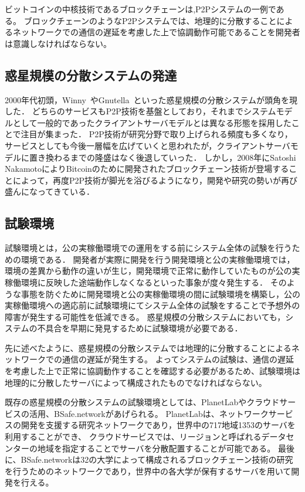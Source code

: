 ビットコインの中核技術であるブロックチェーンは,P2Pシステムの一例である。
ブロックチェーンのようなP2Pシステムでは、地理的に分散することによるネットワークでの通信の遅延を考慮した上で協調動作可能であることを開発者は意識しなければならない。

\subsection{惑星規模の分散システムの発達}

2000年代初頭，Winny~\cite{Winny}やGnutella~\cite{Gnutella}といった惑星規模の分散システムが頭角を現した．
どちらのサービスもP2P技術を基盤としており，それまでシステムモデルとして一般的であったクライアントサーバモデルとは異なる形態を採用したことで注目が集まった．
P2P技術が研究分野で取り上げられる頻度も多くなり，サービスとしても今後一層幅を広げていくと思われたが，クライアントサーバモデルに置き換わるまでの隆盛はなく後退していった．
しかし，2008年にSatoshi NakamotoによりBitcoinのために開発されたブロックチェーン技術が登場することによって，再度P2P技術が脚光を浴びるようになり，開発や研究の勢いが再び盛んになってきている．

\subsection{試験環境}

試験環境とは，公の実稼働環境での運用をする前にシステム全体の試験を行うための環境である．
開発者が実際に開発を行う開発環境と公の実稼働環境では，環境の差異から動作の違いが生じ，開発環境で正常に動作していたものが公の実稼働環境に反映した途端動作しなくなるといった事象が度々発生する．
そのような事態を防ぐために開発環境と公の実稼働環境の間に試験環境を構築し，公の実稼働環境への適応前に試験環境にてシステム全体の試験をすることで予想外の障害が発生する可能性を低減できる。
惑星規模の分散システムにおいても，システムの不具合を早期に発見するために試験環境が必要である．

先に述べたように、惑星規模の分散システムでは地理的に分散することによるネットワークでの通信の遅延が発生する。
よってシステムの試験は、通信の遅延を考慮した上で正常に協調動作することを確認する必要があるため、試験環境は地理的に分散したサーバによって構成されたものでなければならない。

既存の惑星規模の分散システムの試験環境としては、PlanetLabやクラウドサービスの活用、BSafe.networkがあげられる。
PlanetLabは、ネットワークサービスの開発を支援する研究ネットワークであり，世界中の717地域1353のサーバを利用することができ、
クラウドサービスでは、リージョンと呼ばれるデータセンターの地域を指定することでサーバを分散配置することが可能である。
最後に、BSafe.networkは32の大学によって構成されるブロックチェーン技術の研究を行うためのネットワークであり，世界中の各大学が保有するサーバを用いて開発を行える。

